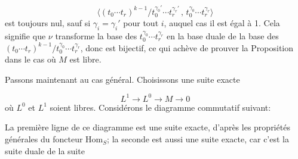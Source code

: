 \begin{equation*}
\langle (t_0 \cdots t_r)^{k-1}/t_0^{\gamma_0'} \cdots t_r^{\gamma_r'} \, , \, t_0^{\gamma_0} \cdots t_r^{\gamma_r} \rangle
\end{equation*}
est toujours nul, sauf si $\gamma_i = \gamma_i'$ pour tout $i$, auquel cas il est égal à 1. Cela signifie que $\nu$ transforme la base des $t_0^{\gamma_0} \cdots t_r^{\gamma_r}$ en la base duale de la base des $(t_0 \cdots t_r)^{k-1}/t_0^{\gamma_0} \cdots t_r^{\gamma_r}$, donc est bijectif, ce qui achève de prouver la Proposition dans le cas où $M$ est libre.

Passons maintenant au cas général. Choisissons une suite exacte

\begin{equation*}
L^1 \to L^0 \to M \to 0
\end{equation*}
où $L^0$ et $L^1$ soient libres. Considérons le diagramme commutatif suivant:

\begin{center}
\end{center}
La première ligne de ce diagramme est une suite exacte, d'après les propriétés générales du foncteur $\mathrm{Hom}_S$; la seconde est aussi une suite exacte, car c'est la suite duale de la suite

